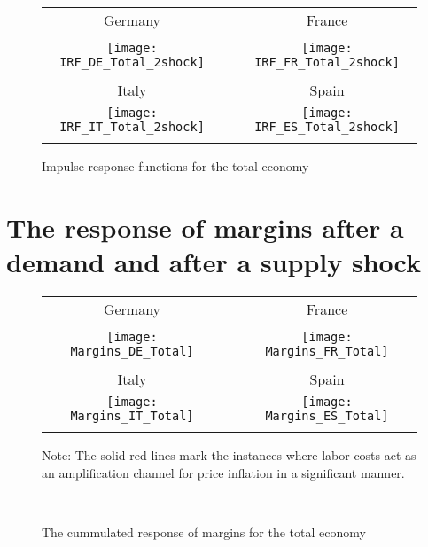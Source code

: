 \documentclass[11pt]{article}
\begin{document}
\begin{appendices}
\begin{figure}[!htb]
\begin{center}
\begin{tabular}{ccc}
Germany &  & France \\
&  &  \\
\texttt{[image: IRF\_DE\_Total\_2shock]} &  & %
\texttt{[image: IRF\_FR\_Total\_2shock]} \\
\\
Italy &  & Spain \\
\texttt{[image: IRF\_IT\_Total\_2shock]} &  & %
\texttt{[image: IRF\_ES\_Total\_2shock]} \\
&  &
\end{tabular}
\caption{Impulse response functions for the total economy}
\label{fig: IRFunres}
\end{center}
\end{figure}


\clearpage

\section{The response of margins after a demand and after a supply shock}
\label{AppendixMarginsSVAR2}

\begin{figure}[!htb]
\begin{center}
\begin{tabular}{ccc}
Germany &  & France \\
&  &  \\
\texttt{[image: Margins\_DE\_Total]} &  & %
\texttt{[image: Margins\_FR\_Total]} \\
\\
Italy &  & Spain \\
\texttt{[image: Margins\_IT\_Total]} &  & %
\texttt{[image: Margins\_ES\_Total]} \\
&  &
\end{tabular}
\parbox{1\textwidth}{\small Note: The solid red lines mark the instances where labor costs act as an amplification channel for price inflation in a significant manner.}\\
\caption{The cummulated response of margins for the total economy}
\label{fig: IRFunres}
\end{center}
\end{figure}



\end{appendices}
\end{document}
